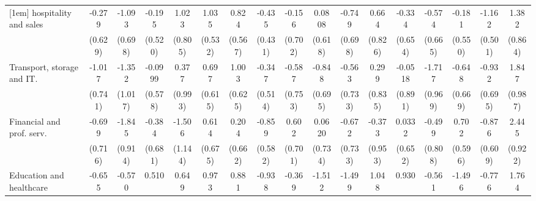 {\begin{tabular}{l*{16}{c}}
[1em]
hospitality and sales&      -0.279         &      -1.093         &      -0.195         &       1.023         &       1.035         &       0.824         &      -0.435         &      -0.156         &      0.0808         &      -0.749         &       0.664         &      -0.334         &      -0.574         &      -0.181         &      -1.162\sym{*}  &       1.382         \\
                    &     (0.629)         &     (0.698)         &     (0.520)         &     (0.805)         &     (0.532)         &     (0.567)         &     (0.431)         &     (0.702)         &     (0.618)         &     (0.698)         &     (0.826)         &     (0.654)         &     (0.665)         &     (0.550)         &     (0.501)         &     (0.864)         \\
[1em]
Transport, storage and IT.&      -1.017         &      -1.352         &     -0.0999         &       0.377         &       0.697         &       1.003         &      -0.347         &      -0.587         &      -0.848         &      -0.563         &       0.299         &     -0.0518         &      -1.717         &      -0.648         &      -0.932         &       1.847         \\
                    &     (0.741)         &     (1.017)         &     (0.578)         &     (0.993)         &     (0.615)         &     (0.625)         &     (0.514)         &     (0.753)         &     (0.695)         &     (0.733)         &     (0.835)         &     (0.891)         &     (0.969)         &     (0.669)         &     (0.695)         &     (0.987)         \\
[1em]
Financial and prof. serv.&      -0.699         &      -1.845\sym{*}  &      -0.384         &      -1.506         &       0.614         &       0.204         &      -0.859         &       0.602         &      0.0620         &      -0.672         &      -0.373         &      0.0332         &      -0.499         &       0.702         &      -0.876         &       2.445\sym{**} \\
                    &     (0.716)         &     (0.914)         &     (0.681)         &     (1.144)         &     (0.675)         &     (0.662)         &     (0.582)         &     (0.701)         &     (0.734)         &     (0.733)         &     (0.953)         &     (0.652)         &     (0.808)         &     (0.596)         &     (0.609)         &     (0.922)         \\
[1em]
Education and healthcare&      -0.655         &      -0.570         &       0.510         &       0.649         &       0.973         &       0.881         &      -0.938         &      -0.369         &      -1.512         &      -1.499         &       1.048         &       0.930         &      -0.561         &      -1.496         &      -0.776         &       1.764         \\

\end{tabular}}
